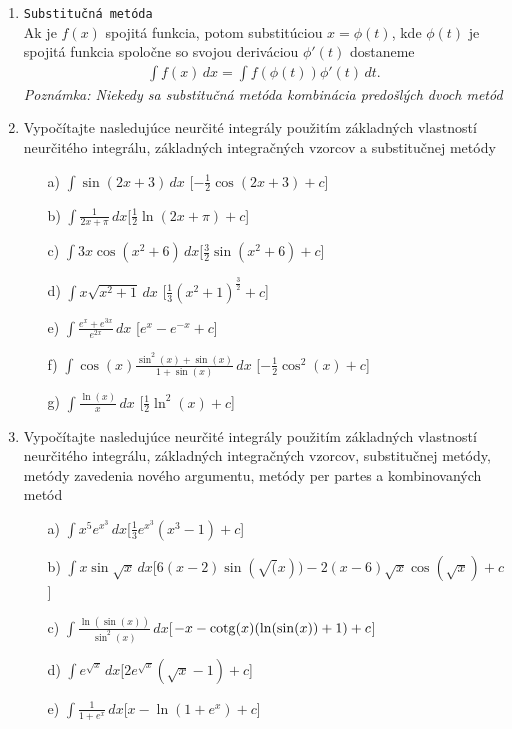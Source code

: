 \begin{enumerate}
\item  \texttt{Substitučná metóda} \\
Ak je $f(x)$ spojitá funkcia, potom substitúciou $x=\phi(t)$, kde $\phi(t)$ je spojitá funkcia spoločne so svojou deriváciou $\phi'(t)$ dostaneme
\begin{align*}
\int f(x) \, dx=\int f(\phi(t))\phi'(t) \, dt.
\end{align*}
\textit{Poznámka: Niekedy sa substitučná metóda kombinácia predošlých dvoch metód}

\item Vypočítajte nasledujúce neurčité integrály použitím základných vlastností neurčitého integrálu, základných integračných vzorcov a substitučnej metódy
\begin{enumerate}
\item[a)]{$ \int \sin(2x+3) \,dx$}\hspace{\fill} [$-\frac{1}{2}\cos(2x+3) +c$]
\item[b)]{$ \int \frac{1}{2x+\pi} \,dx$}\hspace{\fill}[$\frac{1}{2}\ln(2x+\pi) +c$]
\item[c)]{$ \int 3x\cos(x^2+6) \,dx$}\hspace{\fill}[$\frac{3}{2}\sin(x^2+6) +c$]
\item[d)]{$ \int x\sqrt{x^2+1} \,dx$}
\hspace{\fill}[$\frac{1}{3}(x^2+1)^{\frac{3}{2}} +c$]
\item[e)]{$ \int \frac{e^x+e^{3x}}{e^{2x}} \,dx$}
\hspace{\fill}[$e^x-e^{-x} +c$]
\item[f)]{$ \int \cos(x)\frac{\sin^2(x)+\sin(x)}{1+\sin(x)} \,dx$}
\hspace{\fill}[$-\frac{1}{2}\cos^2(x) +c$]
\item[g)]{$ \int \frac{\ln(x)}{x} \,dx$}
\hspace{\fill}[$\frac{1}{2}\ln^2(x) +c$]
\end{enumerate}


\item Vypočítajte nasledujúce neurčité integrály použitím základných vlastností neurčitého integrálu, základných integračných vzorcov, substitučnej metódy, metódy zavedenia nového argumentu, metódy per partes a kombinovaných metód

\begin{enumerate}
\item[a)]{$\int x^5 e^{x^3} \,dx $}\hspace{\fill}[$\frac{1}{3}e^{x^3}(x^3-1) +c$]
\item[b)]{$\int x\sin{\sqrt{x}} \,dx $}\hspace{\fill}[$6(x-2)\sin(\sqrt(x))-2(x-6)\sqrt{x}\cos(\sqrt{x}) +c$]
\item[c)]{$\int \frac{\ln(\sin(x))}{\sin^2(x)} \,dx $}\hspace{\fill}[$-x -\operatorname{cotg}(x)(\ln(\sin(x))+1)+c$]
\item[d)]{$\int e^{\sqrt{x}} \,dx $}\hspace{\fill}[$2e^{\sqrt{x}}(\sqrt{x}-1)+c$]
\item[e)]{$\int \frac{1}{1+e^x} \,dx $}\hspace{\fill}[$x-\ln(1+e^x)+c$]



\end{enumerate}
\end{enumerate}
